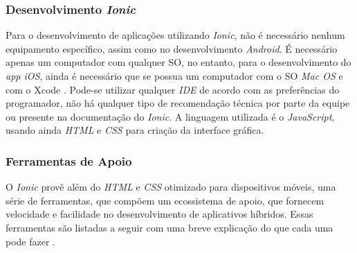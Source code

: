 \subsubsection{Desenvolvimento \textit{Ionic}} \label{subsubsection:dev-ionic}
Para o desenvolvimento de aplicações utilizando \textit{Ionic}, não é necessário nenhum equipamento específico, assim como no desenvolvimento \textit{Android}.
É necessário apenas um computador com qualquer SO, no entanto, para o desenvolvimento do \textit{app iOS}, ainda é necessário que se possua um computador com o
SO \textit{Mac OS} e com o Xcode \cite{drifty_installing_2016}.
Pode-se utilizar qualquer \textit{IDE} de acordo com as preferências do programador, não há qualquer tipo de recomendação técnica por parte da equipe ou presente na documentação do \textit{Ionic}.
A linguagem utilizada é o \textit{JavaScript}, usando ainda \textit{HTML} e \textit{CSS} para criação da interface gráfica.

\subsubsection{Ferramentas de Apoio} \label{subsection:ionicferramentasapoio}

O \textit{Ionic} provê além do \textit{HTML} e \textit{CSS} otimizado para dispositivos móveis, 
uma série de ferramentas, que compõem um ecossistema de apoio, que fornecem velocidade e facilidade no desenvolvimento de aplicativos híbridos. 
Essas ferramentas são listadas a seguir com uma breve explicação do que cada uma pode fazer \cite{drifty_ionic:_2016}.

